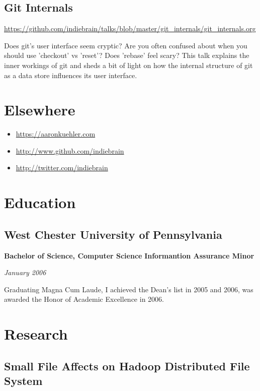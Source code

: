 \documentclass[12pt letterpaper notitlepage]{article}
\begin{document}
\subsection*{Git Internals}
\label{sec:org7131ae0}

\url{https://github.com/indiebrain/talks/blob/master/git\_internals/git\_internals.org}

Does git's user interface seem cryptic? Are you often confused about when you should use 'checkout' vs 'reset'? Does 'rebase' feel scary? This talk explains the inner workings of git and sheds a bit of light on how the internal structure of git as a data store influences its user interface.

\section*{Elsewhere}
\label{sec:orgf9a78b0}

\begin{itemize}
\item \url{https://aaronkuehler.com}
\item \url{http://www.github.com/indiebrain}
\item \url{http://twitter.com/indiebrain}
\end{itemize}

\section*{Education}
\label{sec:org3374d89}

\subsection*{West Chester University of Pennsylvania}
\label{sec:orgbcbe374}

\textbf{Bachelor of Science, Computer Science}
\textbf{Informantion Assurance Minor}

\emph{January 2006}

Graduating Magna Cum Laude, I achieved the Dean's list in 2005 and 2006, was awarded the Honor of Academic Excellence in 2006.

\section*{Research}
\label{sec:org55748a6}

\subsection*{Small File Affects on Hadoop Distributed File System}
\label{sec:orgd58474f}
\end{document}
